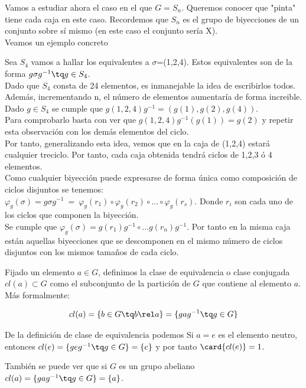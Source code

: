 \documentclass[nochap]{apuntes}
\begin{document}
Vamos a estudiar ahora el caso en el que $G=S_{n}$. Queremos conocer que "pinta" tiene cada caja en este caso. Recordemos que 
$S_{n}$  es el grupo de biyecciones de un conjunto sobre sí mismo (en este caso el conjunto sería X).\\
Veamos un ejemplo concreto
\begin{example}
 Sea $S_{4}$  vamos a hallar los equivalentes a $\sigma$=(1,2,4). Estos equivalentes son de la forma $g\sigma g^{-1} \tq g \in S_{4}$.\\
 Dado que $S_{4}$  consta de 24 elementos, es inmanejable la idea de escribirlos todos. Además, incrementando n, el número de elementos
 aumentaría de forma increible.\\
 Dado $g\in S_{4}$  se cumple que $g(1,2,4)g^{-1}=(g(1),g(2),g(4))$.\\
 Para comprobarlo basta con ver que $g(1,2,4)g^{-1}(g(1))=g(2)$  y repetir esta observación con los demás elementos del ciclo.\\
 Por tanto, generalizando esta idea, vemos que en la caja de (1,2,4) estará cualquier treciclo. Por tanto, cada caja obtenida tendrá
 ciclos de 1,2,3 ó 4 elementos.\\
 Como cualquier biyección puede expresarse de forma única como composición de ciclos disjuntos se tenemos:\\
 $\varphi_{g}(\sigma)=g\sigma g^{-1}\ = \ \varphi_{g}(r_{1}) \circ \varphi_{g}(r_{2}) \circ ... \circ \varphi_{g}(r_{s})$. Donde $r_{i}$  son cada uno de los
 ciclos que componen la biyección.\\
 Se cumple que $\varphi_{g}(\sigma)=g(r_{1})g^{-1} \circ ... g(r_{n})g^{-1}$.  Por tanto en la misma caja están aquellas biyecciones que se descomponen
 en el mismo número de ciclos disjuntos con los mismos tamaños de cada ciclo.
\end{example}

\begin{defn}
Fijado un elemento $a\in G$, definimos la clase de equivalencia o clase conjugada $cl(a) \subset G$ como el subconjunto de la partición de $G$ que contiene al elemento $a$. Más formalmente:

\[ cl(a) = \{ b \in G \tq b\rel a \} = \{ gag^{-1} \tq g \in G \} \]
\end{defn}

\begin{remark} De la definición de clase de equivalencia podemos Si $a = e$ es el elemento neutro, entonces $cl(e) = \{ geg^{-1} \tq g\in G\} = \{ e\} $ y por tanto $\card{cl(e)} = 1$. 

También se puede ver que si $G$ es un grupo abeliano $cl(a) = \{ gag^{-1} \tq g \in G\} = \{ a \}$.
\end{remark}
\end{document}
